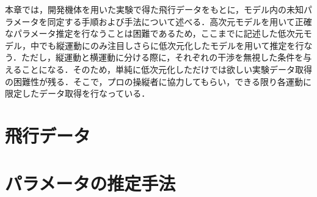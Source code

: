 
本章では，開発機体を用いた実験で得た飛行データをもとに，モデル内の未知パラメータを同定する手順および手法について述べる．高次元モデルを用いて正確なパラメータ推定を行なうことは困難であるため，ここまでに記述した低次元モデル，中でも縦運動にのみ注目しさらに低次元化したモデルを用いて推定を行なう．ただし，縦運動と横運動に分ける際に，それぞれの干渉を無視した条件を与えることになる．そのため，単純に低次元化しただけでは欲しい実験データ取得の困難性が残る．そこで，プロの操縦者に協力してもらい，できる限り各運動に限定したデータ取得を行なっている．

\section{飛行データ}





\section{パラメータの推定手法}
